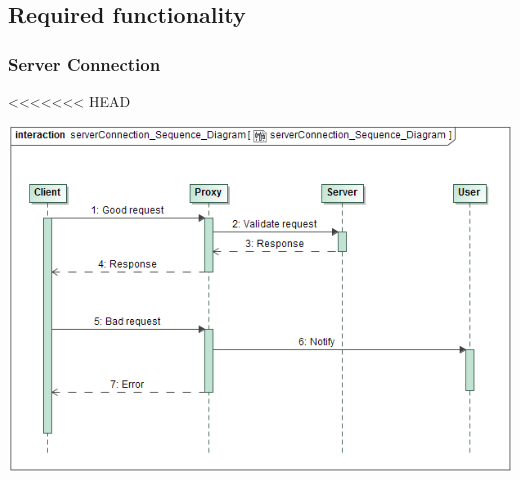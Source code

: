 \documentclass[11pt]{article}
\begin{document}
\subsection{Required functionality}

\subsubsection{Server Connection}
<<<<<<< HEAD
\begin{center} 
	\includegraphics[width=\textwidth]{../Images/serverConnection_Sequence_Diagram.png}\\[0.5cm]
\end{center}

\newpage
\end{document}

